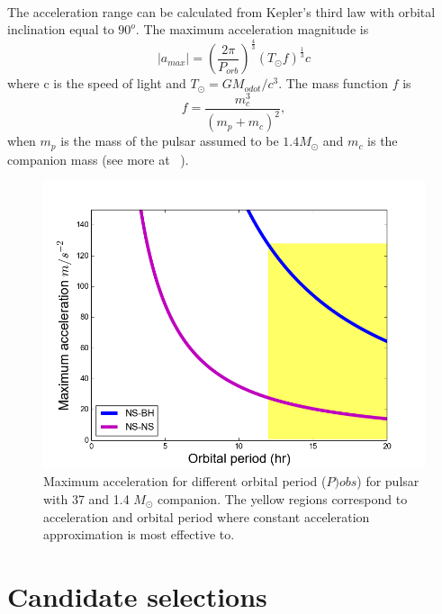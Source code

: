 \documentclass[thesis_msc.tex]{subfiles}
\begin{document}
\paragraph{} The acceleration range can be calculated from Kepler's third law with orbital inclination equal to $90^o$. The maximum acceleration magnitude is 
\begin{equation}
|a_{max}|=(\frac{2\pi}{P_{orb}})^{\frac{4}{3}}(T_\odot f)^{\frac{1}{3}}c
\end{equation}
where c is the speed of light and $T_\odot=GM_{odot}/c^3$. The mass function $f$ is 
\begin{equation}
f=\frac{m_c^3}{(m_p+m_c)^2},
\end{equation}
when $m_p$ is the mass of the pulsar assumed to be $1.4M_\odot$ and $m_c$ is the companion mass (see more at ~\cite{ng2015high}). 


\begin{figure}[h] \centering
\includegraphics[width=1.0\textwidth]{figures/acc_plot.png}
\caption{Maximum acceleration for different orbital period ($P){obs}$) for pulsar with 37 and 1.4 $M_\odot$ companion. The yellow regions correspond to acceleration and orbital period where constant acceleration approximation is most effective to. }
\label{Fig:acc_range}
\end{figure}


    \section{Candidate selections}
\end{document}

